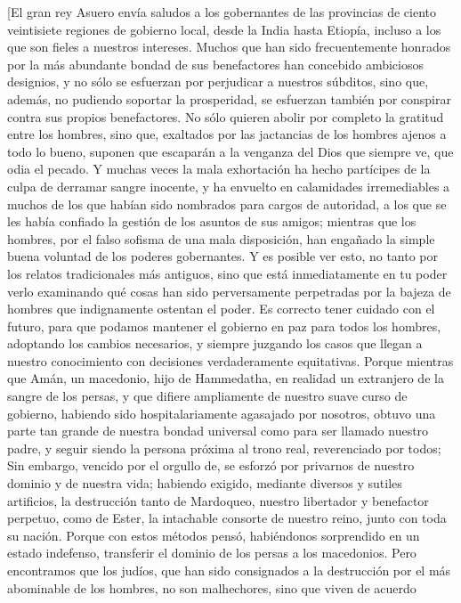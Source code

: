 {[}El gran rey Asuero envía saludos a los gobernantes de las provincias
de ciento veintisiete regiones de gobierno local, desde la India hasta
Etiopía, incluso a los que son fieles a nuestros intereses. Muchos que
han sido frecuentemente honrados por la más abundante bondad de sus
benefactores han concebido ambiciosos designios, y no sólo se esfuerzan
por perjudicar a nuestros súbditos, sino que, además, no pudiendo
soportar la prosperidad, se esfuerzan también por conspirar contra sus
propios benefactores. No sólo quieren abolir por completo la gratitud
entre los hombres, sino que, exaltados por las jactancias de los hombres
ajenos a todo lo bueno, suponen que escaparán a la venganza del Dios que
siempre ve, que odia el pecado. Y muchas veces la mala exhortación ha
hecho partícipes de la culpa de derramar sangre inocente, y ha envuelto
en calamidades irremediables a muchos de los que habían sido nombrados
para cargos de autoridad, a los que se les había confiado la gestión de
los asuntos de sus amigos; mientras que los hombres, por el falso
sofisma de una mala disposición, han engañado la simple buena voluntad
de los poderes gobernantes. Y es posible ver esto, no tanto por los
relatos tradicionales más antiguos, sino que está inmediatamente en tu
poder verlo examinando qué cosas han sido perversamente perpetradas por
la bajeza de hombres que indignamente ostentan el poder. Es correcto
tener cuidado con el futuro, para que podamos mantener el gobierno en
paz para todos los hombres, adoptando los cambios necesarios, y siempre
juzgando los casos que llegan a nuestro conocimiento con decisiones
verdaderamente equitativas. Porque mientras que Amán, un macedonio, hijo
de Hammedatha, en realidad un extranjero de la sangre de los persas, y
que difiere ampliamente de nuestro suave curso de gobierno, habiendo
sido hospitalariamente agasajado por nosotros, obtuvo una parte tan
grande de nuestra bondad universal como para ser llamado nuestro padre,
y seguir siendo la persona próxima al trono real, reverenciado por
todos; Sin embargo, vencido por el orgullo de, se esforzó por privarnos
de nuestro dominio y de nuestra vida; habiendo exigido, mediante
diversos y sutiles artificios, la destrucción tanto de Mardoqueo,
nuestro libertador y benefactor perpetuo, como de Ester, la intachable
consorte de nuestro reino, junto con toda su nación. Porque con estos
métodos pensó, habiéndonos sorprendido en un estado indefenso,
transferir el dominio de los persas a los macedonios. Pero encontramos
que los judíos, que han sido consignados a la destrucción por el más
abominable de los hombres, no son malhechores, sino que viven de acuerdo
